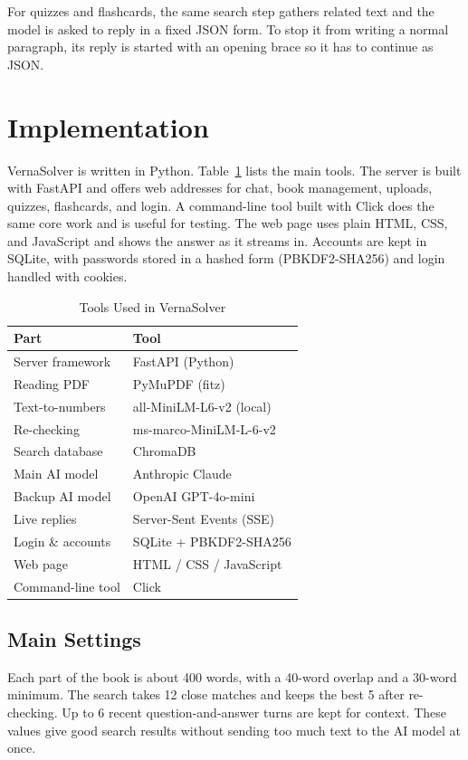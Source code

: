 \documentclass[journal]{IEEEtran}
\begin{document}
For quizzes and flashcards, the same search step gathers related text and
the model is asked to reply in a fixed JSON form. To stop it from writing
a normal paragraph, its reply is started with an opening brace so it has
to continue as JSON.

\section{Implementation}
VernaSolver is written in Python. Table~\ref{tab:stack} lists the main
tools. The server is built with FastAPI and offers web addresses for
chat, book management, uploads, quizzes, flashcards, and login. A
command-line tool built with Click does the same core work and is useful
for testing. The web page uses plain HTML, CSS, and JavaScript and shows
the answer as it streams in. Accounts are kept in SQLite, with passwords
stored in a hashed form (PBKDF2-SHA256) and login handled with cookies.

\begin{table}[!t]
\caption{Tools Used in VernaSolver}
\label{tab:stack}
\centering
\renewcommand{\arraystretch}{1.25}
\begin{tabular}{@{}ll@{}}
\toprule
\textbf{Part} & \textbf{Tool} \\
\midrule
Server framework & FastAPI (Python) \\
Reading PDF      & PyMuPDF (fitz) \\
Text-to-numbers  & all-MiniLM-L6-v2 (local) \\
Re-checking      & ms-marco-MiniLM-L-6-v2 \\
Search database  & ChromaDB \\
Main AI model    & Anthropic Claude \\
Backup AI model  & OpenAI GPT-4o-mini \\
Live replies     & Server-Sent Events (SSE) \\
Login \& accounts & SQLite + PBKDF2-SHA256 \\
Web page         & HTML / CSS / JavaScript \\
Command-line tool & Click \\
\bottomrule
\end{tabular}
\end{table}

\subsection{Main Settings}
Each part of the book is about 400 words, with a 40-word overlap and a
30-word minimum. The search takes 12 close matches and keeps the best 5
after re-checking. Up to 6 recent question-and-answer turns are kept for
context. These values give good search results without sending too much
text to the AI model at once.
\end{document}
